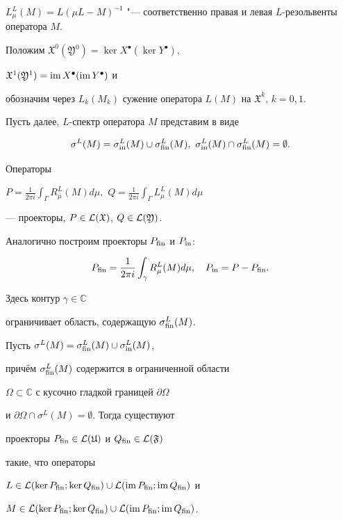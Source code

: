 $L_\mu^L (M)=L(\mu L-M)^{-1}$ "--- соответственно правая и левая $L$-резольвенты оператора $M$.

Положим $\mathfrak X^0(\mathfrak Y^0)=\ker X^\bullet(\ker Y^\bullet)$,

$\mathfrak X^1(\mathfrak Y^1)=\mathop{\rm im}\nolimits X^\bullet(\mathop{\rm im}\nolimits Y^\bullet)$ и

обозначим через $L_k(M_k)$ сужение оператора $L(M)$ на $\mathfrak X^k$, $k=0, 1$.



Пусть далее, $L$-спектр оператора $M$ представим в виде

\begin{equation}\label{manakova:vved01}

\sigma^L (M) = \sigma^L_{\rm in}(M)\cup\sigma_{\rm fin}^L(M),\,\,\sigma^L_{\rm in}(M)\cap\sigma_{\rm fin}^L (M)=\emptyset.

\end{equation}

Операторы

$ \displaystyle

P=\frac{1}{2\pi i}\int_\Gamma \!\! R^L_\mu

(M)d\mu,$ $ \displaystyle Q=\frac{1}{2\pi i}\int_\Gamma \!\! L^L_\mu (M)d\mu

$

--- проекторы, \mbox{$P\in {\cal L}(\mathfrak X)$}, $Q\in {\cal L}(\mathfrak Y)$.





Аналогично построим проекторы $P_{\rm fin}$ и $P_{\rm in}$:

$$

P_{\rm fin} = \frac{1}{2\pi i}\int_\gamma R_\mu^L (M)d\mu,\quad P_{\rm in}=P-P_{\rm fin}.

$$

Здесь контур $\gamma \in \mathbb C$

ограничивает область, содержащую $\sigma^L_{\rm fin} (M)$.



\smallskip



\begin{theorem} Пусть $\sigma^L (M) = \sigma^L_{\rm fin} (M)\cup\sigma^L_{\rm in} (M)${\rm ,}

причём $\sigma^L_{\rm fin} (M)$ со\-дер\-жит\-ся в ограниченной области

$\Omega\subset \mathbb C$ с кусочно гладкой границей $\partial\Omega$

и $\partial\Omega\cap\sigma^L (M)=\emptyset$. Тогда существуют

проекторы $P_{\rm fin}\in{\cal L} (\mathfrak U)$ и $Q_{\rm fin}\in{\cal L}(\mathfrak F)$

такие{\rm ,} что операторы

$L\in{\cal L} (\ker P_{\rm fin}; \ker Q_{\rm fin})\cup{\cal L} (\mathop{\rm im}\nolimits P_{\rm fin}; \mathop{\rm im}\nolimits Q_{\rm fin})$ и

$M\in{\cal L} (\ker P_{\rm fin}; \ker Q_{\rm fin})\cup{\cal L} (\mathop{\rm im}\nolimits P_{\rm fin}; \mathop{\rm im}\nolimits Q_{\rm fin})${\rm .}

\end{theorem}



